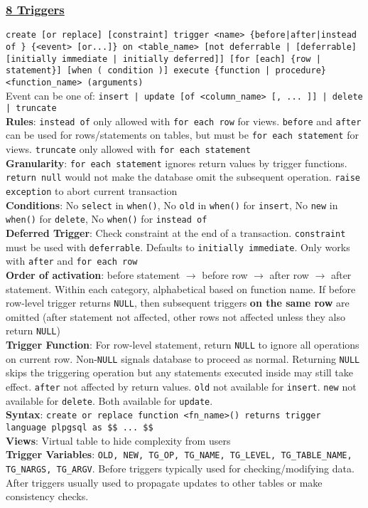 \documentclass{article}
\begin{document}
{\begin{multicols*}{3}
\subsubsection*{\underline{8 Triggers}}
\texttt{create [or replace] [constraint] trigger <name> \{before|after|instead of \} \{<event> [or...]\} on <table\_name> [not deferrable | [deferrable] [initially immediate | initially deferred]] [for [each] \{row | statement\}]  [when ( condition )] execute \{function | procedure\} <function\_name> (arguments)} \\
Event can be one of: \texttt{insert | update [of <column\_name> [, ... ]] | delete | truncate} \\
\textbf{Rules}: \texttt{instead of} only allowed with \texttt{for each row} for views.  \texttt{before} and \texttt{after} can be used for rows/statements on tables, but must be \texttt{for each statement} for views. \texttt{truncate} only allowed with \texttt{for each statement} \\ 
\textbf{Granularity}: \texttt{for each statement} ignores return values by trigger functions. \texttt{return null} would not make the database omit the subsequent operation. \texttt{raise exception} to abort current transaction\\
\textbf{Conditions}: No \texttt{select} in \texttt{when()}, No \texttt{old} in \texttt{when()} for \texttt{insert}, No \texttt{new} in \texttt{when()} for \texttt{delete}, No \texttt{when()} for \texttt{instead of}\\
\textbf{Deferred Trigger}: Check constraint at the end of a transaction. \texttt{constraint} must be used with \texttt{deferrable}. Defaults to \texttt{initially immediate}. Only works with \texttt{after} and \texttt{for each row} \\
\textbf{Order of activation}: before statement $\to$ before row $\to$ after row $\to$ after statement. Within each category, alphabetical based on function name. If before row-level trigger returns \texttt{NULL}, then subsequent triggers \textbf{on the
same row} are omitted (after statement not affected, other rows not affected unless they also return \texttt{NULL})\\
\textbf{Trigger Function}: For row-level statement, return \texttt{NULL} to ignore all operations on current row. Non-\texttt{NULL} signals database to proceed as normal. Returning \texttt{NULL} skips the triggering operation but any statements executed inside may still take effect. \texttt{after} not affected by return values. \texttt{old} not available for \texttt{insert}. \texttt{new} not available for \texttt{delete}. Both available for \texttt{update}.\\
\textbf{Syntax}: \texttt{create or replace function <fn\_name>() returns trigger language plpgsql as \$\$ ... \$\$} \\
\textbf{Views}: Virtual table to hide complexity from users \\
\textbf{Trigger Variables}: \texttt{OLD, NEW, TG\_OP, TG\_NAME, TG\_LEVEL, TG\_TABLE\_NAME, TG\_NARGS, TG\_ARGV}. Before triggers typically used for checking/modifying data. After triggers usually used to propagate updates to other tables or make consistency checks.

\end{multicols*}}
\end{document}
